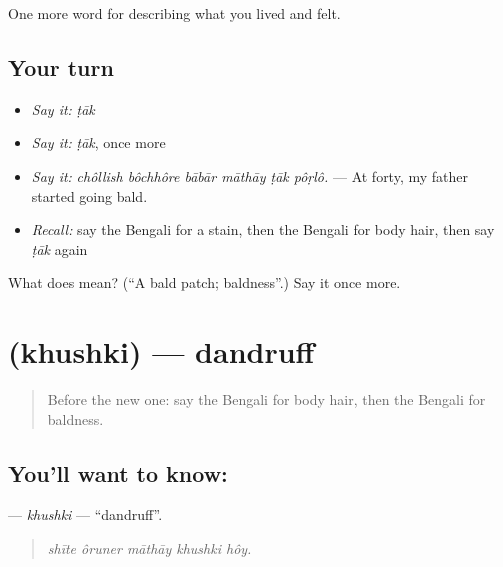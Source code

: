 \begin{grammarlens}[title={What you've built}]
One more word for describing what you lived and felt.
\end{grammarlens}

\subsection*{Your turn}
\begin{itemize}
\raggedright
  \item \emph{Say it:} \emph{ṭāk}
  \item \emph{Say it:} \emph{ṭāk}, once more
  \item \emph{Say it:} \emph{chôllish bôchhôre bābār māthāy ṭāk pôṛlô.} — At forty, my father started going bald.
  \item \emph{Recall:} say the Bengali for a stain, then the Bengali for body hair, then say \emph{ṭāk} again
\end{itemize}

\begin{tcolorbox}[breakable,colback=teal!4,colframe=teal!35!black,title={Before you move on}]
What does  mean? (\textquotedblleft{}A bald patch; baldness\textquotedblright{}.) Say it once more.
\end{tcolorbox}
\section[\texorpdfstring{\bn{খুশকি} (khushki)}{খুশকি (khushki)}]{ (khushki) — dandruff}

\label{lesson:BN-C470-khushki}



\begin{quote}
Before the new one: say the Bengali for body hair, then the Bengali for baldness.
\end{quote}

\subsection*{You'll want to know: }
\textbf{} — \emph{khushki} — \textquotedblleft{}dandruff\textquotedblright{}.

\begin{quote}
    
\end{quote}

\begin{quote}
\emph{shīte ôruner māthāy khushki hôy.}
\end{quote}

